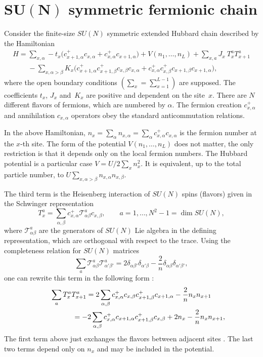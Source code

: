 \section[$SU(N)$ symmetric fermionic chain]{$\boldsymbol{SU(N)}$ symmetric fermionic chain}\label{section2}

Consider the f\/inite-size $SU(N)$ symmetric extended Hubbard chain described by the Hamiltonian
\begin{gather}
H=\sum_{x,\alpha} -t_x\big( c^+_{x+1,\alpha}c_{x,\alpha} + c^+_{x,\alpha}c_{x+1,\alpha}\big)
+  V(n_1,\dots,n_L) + \sum_{x,a} J_x\ T_x^a  T_{x+1}^a\nonumber
\\
\phantom{H=}{}- \sum_{x,\alpha>\beta} K_x\big(
c^+_{x+1,\alpha} c^+_{x+1,\beta} c_{x,\beta} c_{x,\alpha}
+ c^+_{x,\alpha} c^+_{x,\beta} c_{x+1,\beta} c_{x+1,\alpha}\big),\label{H}
\end{gather}
where the open boundary conditions $\left(\sum_x=\sum_{x=1}^{L-1}\right)$ are supposed.
The coef\/f\/icients $t_x$, $J_x$ and~$K_x$ are positive and dependent on the site~$x$.
There are $N$ dif\/ferent f\/lavors of fermions, which are numbered by $\alpha$.
The fermion  creation  $c^+_{x,\alpha}$ and annihilation  $c_{x,\alpha}$ operators
obey the standard  anticommutation relations.

In the above Hamiltonian, $n_x=\sum_{\alpha}n_{x,\alpha}=\sum_{\alpha} c^+_{x,\alpha}c_{x,\alpha}$
is the fermion number at the $x$-th site.
The form of the potential $V(n_1,\dots,n_L)$ does not matter, the
only restriction is that it depends only on the local fermion numbers.
The Hubbard potential is a particular case
$V=U/2\sum_x n_x^2$.
It is equivalent, up to the total particle number,
to $U\sum_{x,\alpha>\beta}n_{x,\alpha}n_{x,\beta}$.


The third term is the Heisenberg interaction of $SU(N)$ spins (f\/lavors) given in
the Schwinger representation
\begin{equation}
\label{schwinger}
T_x^a=\sum_{\alpha,\beta}
c_{x,\alpha}^+ \mathcal{T}^a_{\alpha\beta} c_{x,\beta}, \qquad a=1,\dots,N^2-1=\dim SU(N),
\end{equation}
where $\mathcal{T}^a_{\alpha\beta}$ are the generators of $SU(N)$ Lie
algebra in the def\/ining representation, which are  orthogonal
with respect to the trace.
 Using the completeness relation for $SU(N)$ matrices
\[
\sum_a\mathcal{T}^a_{\alpha\beta}\mathcal{T}^a_{\alpha'\beta'}=
2\delta_{\alpha\beta'} \delta_{\alpha'\beta}  -\frac{2}{n} \delta_{\alpha\beta} \delta_{\alpha'\beta'},
\]
one can rewrite this term in the following form \cite{MA89}:
\begin{gather}
\sum_{a} T_x^a  T_{x+1}^a
=
2\sum_{\alpha,\beta} c^+_{x,\alpha}  c_{x,\beta} c^+_{x+1,\beta} c_{x+1,\alpha}
- \frac{2}{n} n_x n_{x+1}\nonumber
\\
\hphantom{\sum_{a} T_x^a  T_{x+1}^a}{}=
-2\sum_{\alpha,\beta} c^+_{x,\alpha}  c_{x+1,\alpha}  c^+_{x+1,\beta} c_{x,\beta}+2n_x- \frac{2}{n} n_x n_{x+1},\label{heis}
\end{gather}
The f\/irst term above just exchanges the f\/lavors between
adjacent sites \cite{AL86}. The last two terms depend only on $n_x$ and may be included in the potential.

